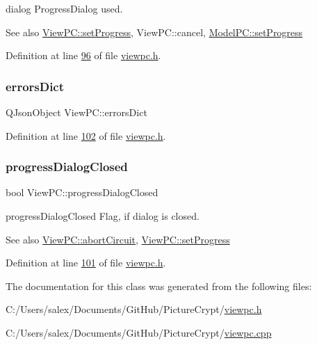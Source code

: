 dialog Progress\+Dialog used. 

\begin{DoxySeeAlso}{See also}
\mbox{\hyperlink{class_view_p_c_a9c32a1fdb6ead84e5ada8fba8860c7ed}{View\+P\+C\+::set\+Progress}}, View\+P\+C\+::cancel, \mbox{\hyperlink{class_model_p_c_a25a4496e129e87ac96f12257a123b84f}{Model\+P\+C\+::set\+Progress}} 
\end{DoxySeeAlso}


Definition at line \mbox{\hyperlink{viewpc_8h_source_l00096}{96}} of file \mbox{\hyperlink{viewpc_8h_source}{viewpc.\+h}}.

\mbox{\label{class_view_p_c_a26f90436aca32e5bad46f5e69a7e7e09}} 
\subsubsection{\texorpdfstring{errors\+Dict}{errorsDict}}
{\footnotesize\ttfamily Q\+Json\+Object View\+P\+C\+::errors\+Dict}



Definition at line \mbox{\hyperlink{viewpc_8h_source_l00102}{102}} of file \mbox{\hyperlink{viewpc_8h_source}{viewpc.\+h}}.

\mbox{\label{class_view_p_c_add8c82aa2b0b934212aa5bde9277ab36}} 
\subsubsection{\texorpdfstring{progress\+Dialog\+Closed}{progressDialogClosed}}
{\footnotesize\ttfamily bool View\+P\+C\+::progress\+Dialog\+Closed}



progress\+Dialog\+Closed Flag, if dialog is closed. 

\begin{DoxySeeAlso}{See also}
\mbox{\hyperlink{class_view_p_c_ad7ba2fcf1d17862de15e32432823f7b0}{View\+P\+C\+::abort\+Circuit}}, \mbox{\hyperlink{class_view_p_c_a9c32a1fdb6ead84e5ada8fba8860c7ed}{View\+P\+C\+::set\+Progress}} 
\end{DoxySeeAlso}


Definition at line \mbox{\hyperlink{viewpc_8h_source_l00101}{101}} of file \mbox{\hyperlink{viewpc_8h_source}{viewpc.\+h}}.



The documentation for this class was generated from the following files\+:\begin{DoxyCompactItemize}
\item 
C\+:/\+Users/salex/\+Documents/\+Git\+Hub/\+Picture\+Crypt/\mbox{\hyperlink{viewpc_8h}{viewpc.\+h}}\item 
C\+:/\+Users/salex/\+Documents/\+Git\+Hub/\+Picture\+Crypt/\mbox{\hyperlink{viewpc_8cpp}{viewpc.\+cpp}}\end{DoxyCompactItemize}
